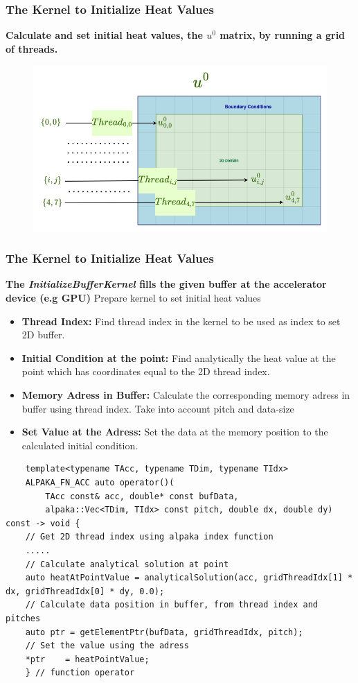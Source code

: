\documentclass[9pt]{beamer}
\begin{document}
\begin{frame}
\frametitle{The Kernel to Initialize Heat Values}
\textbf{Calculate and set initial heat values, the $u^{0}$ matrix, by running a grid of threads.}
\hspace{2.0\baselineskip}
\begin{figure}
    \centering
    \includegraphics[width=0.8\linewidth]{Screenshot from 2024-09-19 18-45-43.png}
    \label{fig:enter-label}
\end{figure}
\end{frame}

\begin{frame}[fragile]
\frametitle{The Kernel to Initialize Heat Values}
\small

\textbf{ The \textit{InitializeBufferKernel} fills the given buffer at the accelerator device (e.g GPU)}
    \lstset{basicstyle=\ttfamily\scriptsize}
    Prepare kernel to set initial heat values
    \begin{itemize}
    \item \textbf{Thread Index:} Find thread index in the kernel to be used as index to set 2D buffer.
    \item \textbf{Initial Condition at the point:} Find analytically the heat value at the point which has coordinates equal to the 2D thread index.
    \item \textbf{Memory Adress in Buffer:} Calculate the corresponding memory adress in buffer using thread index. Take into account pitch and data-size
    \item \textbf{Set Value at the Adress:} Set the data at the memory position to the calculated initial condition.
    \end{itemize}
     \lstset{basicstyle=\ttfamily\tiny}
    \begin{lstlisting}
    template<typename TAcc, typename TDim, typename TIdx>
    ALPAKA_FN_ACC auto operator()(
        TAcc const& acc, double* const bufData,
        alpaka::Vec<TDim, TIdx> const pitch, double dx, double dy) const -> void {
    // Get 2D thread index using alpaka index function
    .....
    // Calculate analytical solution at point
    auto heatAtPointValue = analyticalSolution(acc, gridThreadIdx[1] * dx, gridThreadIdx[0] * dy, 0.0);
    // Calculate data position in buffer, from thread index and pitches
    auto ptr = getElementPtr(bufData, gridThreadIdx, pitch);
    // Set the value using the adress
    *ptr    = heatPointValue;
    } // function operator
    \end{lstlisting}

\end{frame}
\end{document}
